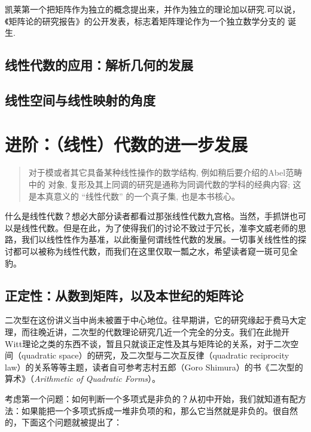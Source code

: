 凯莱第一个把矩阵作为独立的概念提出来，并作为独立的理论加以研究.可以说，《矩阵论的研究报告》的公开发表，标志着矩阵理论作为一个独立数学分支的
诞生.

\subsection{线性代数的应用：解析几何的发展}


\subsection{线性空间与线性映射的角度}


\section{进阶：（线性）代数的进一步发展}
\begin{quote}

\kaishu
对于模或者其它具备某种线性操作的数学结构, 例如稍后要介绍的Abel范畴中的
对象, 复形及其上同调的研究是通称为同调代数的学科的经典内容; 这是本真意义的
“线性代数” 的一个真子集, 也是本书核心。

    
\end{quote}

什么是线性代数？想必大部分读者都看过那张线性代数九宫格。当然，手抓饼也可以是线性代数。但是在此，为了使得我们的讨论不致过于冗长，准李文威老师的思路，我们以线性性作为基准，以此衡量何谓线性代数的发展。一切事关线性性的探讨都可以被称为线性代数，而我们在这里仅取一瓢之水，希望读者窥一斑可见全豹。

\subsection{正定性：从数到矩阵，以及本世纪的矩阵论}

二次型在这份讲义当中尚未被置于中心地位。往早期讲，它的研究缘起于费马大定理，而往晚近讲，二次型的代数理论研究几近一个完全的分支。我们在此抛开Witt理论之类的东西不谈，暂且只就谈正定性及其与矩阵论的关系，对于二次空间（quadratic space）的研究，及二次型与二次互反律（quadratic reciprocity law）的关系等等主题，读者自可参考志村五郎（Goro Shimura）的书《二次型的算术》（\textit{Arithmetic of Quadratic Forms}）。

考虑第一个问题：如何判断一个多项式是非负的？从初中开始，我们就知道有配方法：如果能把一个多项式拆成一堆非负项的和，那么它当然就是非负的。很自然的，下面这个问题就被提出了：

